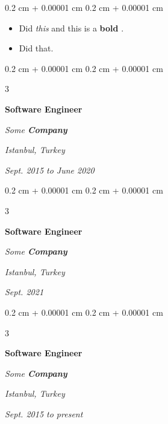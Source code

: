 \documentclass[10pt, letterpaper]{article}
\newenvironment{highlights}{
    \begin{itemize}[
        topsep=0.10 cm,
        parsep=0.10 cm,
        partopsep=0pt,
        itemsep=0pt,
        leftmargin=0.4 cm + 10pt + 0.6 cm
    ]
}{
    \end{itemize}
} %
\newenvironment{onecolentry}{
    \begin{adjustwidth}{
        0.2 cm + 0.00001 cm
    }{
        0.2 cm + 0.00001 cm
    }
}{
    \end{adjustwidth}
} %
\newenvironment{threecolentry}[3][]{
    \onecolentry
    \def\thirdColumn{#3}
    \setcolumnwidth{0.6 cm, \fill, 4.5 cm}
    \begin{paracol}{3}
    #2 \switchcolumn
}{
    \switchcolumn \raggedleft \thirdColumn
    \end{paracol}
    \endonecolentry
} %
\let\hrefWithoutArrow\href
\renewcommand{\href}[2]{\hrefWithoutArrow{#1}{\mbox{\ifthenelse{\equal{#2}{}}{ }{#2 }\raisebox{.15ex}{\footnotesize \faExternalLink*}}}}
\begin{document}
        \vspace{0.10 cm-3px}
        \begin{onecolentry}
            \begin{highlights}
                \item Did \textit{this} and this is a \textbf{bold} \href{https://example.com}{link}.
                \item Did that.
            \end{highlights}
        \end{onecolentry}


        \vspace{0.2 cm-3px}

        \begin{threecolentry}{
            \vspace*{\fill}
            \textbullet
            \vspace*{3px}
            \vspace*{\fill}
        }{
        \textit{Istanbul, Turkey}    
            
        \textit{Sept. 2015 to June 2020}}
            \textbf{Software Engineer}
            
            \textit{Some \textbf{Company}}
        \end{threecolentry}



        \vspace{0.2 cm-3px}

        \begin{threecolentry}{
            \vspace*{\fill}
            \textbullet
            \vspace*{3px}
            \vspace*{\fill}
        }{
        \textit{Istanbul, Turkey}    
            
        \textit{Sept. 2021}}
            \textbf{Software Engineer}
            
            \textit{Some \textbf{Company}}
        \end{threecolentry}



        \vspace{0.2 cm-3px}

        \begin{threecolentry}{
            \vspace*{\fill}
            \textbullet
            \vspace*{3px}
            \vspace*{\fill}
        }{
        \textit{Istanbul, Turkey}    
            
        \textit{Sept. 2015 to present}}
            \textbf{Software Engineer}
            
            \textit{Some \textbf{Company}}
        \end{threecolentry}
\end{document}
